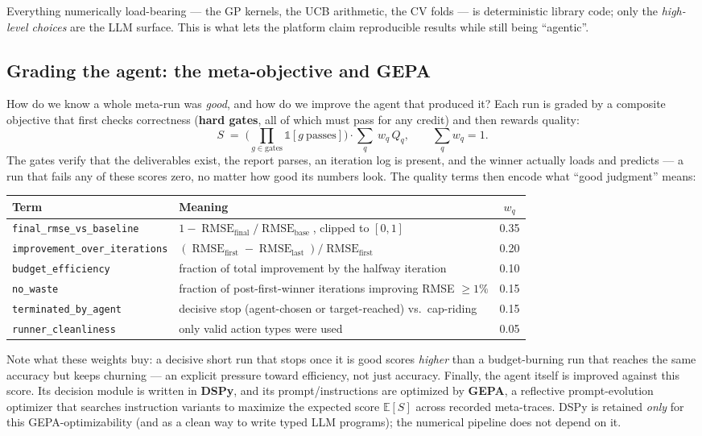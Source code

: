\documentclass[11pt]{article}
\newcommand{\E}{\mathbb{E}}
\newcommand{\indic}{\mathbb{1}}
\DeclareMathOperator{\RMSE}{RMSE}
\begin{document}
Everything numerically load-bearing --- the GP kernels, the UCB arithmetic, the CV folds --- is
deterministic library code; only the \emph{high-level choices} are the LLM surface. This is what
lets the platform claim reproducible results while still being ``agentic''.

\subsection{Grading the agent: the meta-objective and GEPA}
How do we know a whole meta-run was \emph{good}, and how do we improve the agent that produced it?
Each run is graded by a composite objective that first checks correctness (\textbf{hard gates},
all of which must pass for any credit) and then rewards quality:
\begin{equation}
S \;=\;
\Big(\textstyle\prod_{g\in\text{gates}}\indic[g\ \text{passes}]\Big)
\cdot \sum_{q}\ w_q\,Q_q,
\qquad \sum_q w_q = 1 .
\end{equation}
The gates verify that the deliverables exist, the report parses, an iteration log is present, and
the winner actually loads and predicts --- a run that fails any of these scores zero, no matter how
good its numbers look. The quality terms then encode what ``good judgment'' means:

\begin{center}
\begin{tabular}{@{}llc@{}}
\toprule
Term & Meaning & $w_q$ \\
\midrule
\texttt{final\_rmse\_vs\_baseline} & $1-\RMSE_{\text{final}}/\RMSE_{\text{base}}$, clipped to $[0,1]$ & 0.35 \\
\texttt{improvement\_over\_iterations} & $(\RMSE_{\text{first}}-\RMSE_{\text{last}})/\RMSE_{\text{first}}$ & 0.20 \\
\texttt{budget\_efficiency} & fraction of total improvement by the halfway iteration & 0.10 \\
\texttt{no\_waste} & fraction of post-first-winner iterations improving RMSE $\ge1\%$ & 0.15 \\
\texttt{terminated\_by\_agent} & decisive stop (agent-chosen or target-reached) vs.\ cap-riding & 0.15 \\
\texttt{runner\_cleanliness} & only valid action types were used & 0.05 \\
\bottomrule
\end{tabular}
\end{center}

Note what these weights buy: a decisive short run that stops once it is good scores \emph{higher}
than a budget-burning run that reaches the same accuracy but keeps churning --- an explicit pressure
toward efficiency, not just accuracy. Finally, the agent itself is improved against this score. Its
decision module is written in \textbf{DSPy}, and its prompt/instructions are optimized by
\textbf{GEPA}, a reflective prompt-evolution optimizer that searches instruction variants to
maximize the expected score $\E[S]$ across recorded meta-traces. DSPy is retained \emph{only} for
this GEPA-optimizability (and as a clean way to write typed LLM programs); the numerical pipeline
does not depend on it.
\end{document}

